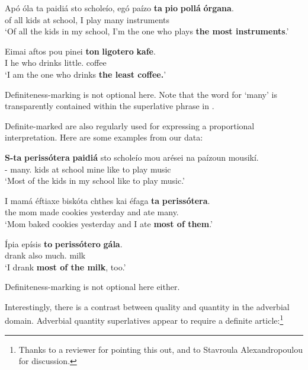 \documentclass[output=paper
,modfonts
,nonflat]{langsci/langscibook}
\begin{document}
\ea \label{ex:coppockstrand:14}
\gll Apó óla ta paidiá sto scholeío, egó paízo \textbf{ta} \textbf{pio} \textbf{pollá} \textbf{órgana}.\\
of all   kids at school, I play  \cmpr{} many instruments\\
\glt `Of all the kids in my school, I'm the one who plays \textbf{the most instruments}.'
\z

\ea \label{ex:coppockstrand:15}
\gll Eimai aftos pou pinei \textbf{ton}  \textbf{ligotero} \textbf{kafe}.\\
I he who drinks  little.\cmpr{} coffee\\
\glt `I am the one who drinks \textbf{the least coffee.}'
\z

Definiteness-marking is not optional here. Note that the word for `many' is transparently contained within the superlative phrase in .

Definite-marked  are also regularly used for expressing a proportional interpretation. Here are some examples from our data:

\ea \label{ex:coppockstrand:16}
\gll \textbf{S-ta} \textbf{perissótera} \textbf{paidiá} sto scholeío mou arései na paízoun mousikí.\\
\dat- many.\cmpr{} kids at school mine like to play music\\ 
\glt `Most of the kids in my school like to play music.'
\z


\ea \label{ex:coppockstrand:17}
\gll I mamá éftiaxe biskóta chthes kai éfaga \textbf{ta} \textbf{perissótera}.\\
the mom made cookies yesterday and ate  many.\cmpr{}\\
\glt `Mom baked cookies yesterday and I ate \textbf{most of them}.'
\z


\ea \label{ex:coppockstrand:18}
\gll Ípia epísis \textbf{to} \textbf{perissótero} \textbf{gála}.\\
drank also  much.\cmpr{} milk\\
\glt `I drank \textbf{most of the milk}, too.'
\z

Definiteness-marking is not optional here either.

Interestingly, there is a contrast between quality and quantity in the adverbial domain. Adverbial quantity superlatives appear to require a definite article:\footnote{Thanks to a reviewer for pointing this out, and to Stavroula Alexandropoulou for discussion.}
\end{document}
